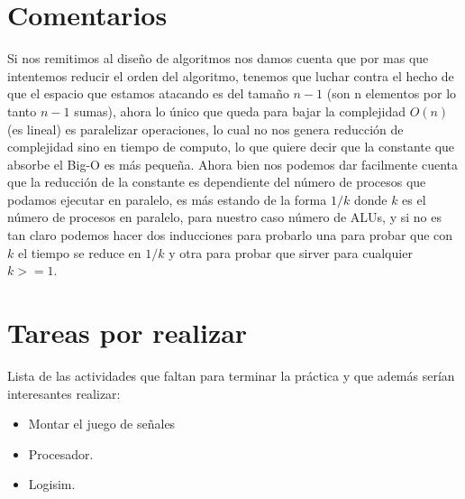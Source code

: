 \documentclass[%
		final,
		notitlepage,
		narroweqnarray,
		inline,
		twoside,
		]{ieee}
\begin{document}
	\section{Comentarios}


	

	
	Si nos remitimos al diseño de algoritmos nos damos cuenta que por mas que intentemos reducir el orden del algoritmo, tenemos que luchar contra el hecho de que el espacio que estamos atacando es del tamaño $n-1$ (son n elementos por lo tanto $n-1$ sumas), ahora lo único que queda para bajar la complejidad $O(n)$ (es lineal) es paralelizar operaciones, lo cual no nos genera reducción de complejidad sino en tiempo de computo, lo que quiere decir que la constante que absorbe el Big-O  es más pequeña. Ahora bien nos podemos dar facilmente cuenta que la reducción de la constante es dependiente del número de procesos que podamos ejecutar en paralelo, es más estando de la forma $1/k$ donde $k$ es el número de procesos en paralelo, para nuestro caso número de ALUs, y si no es tan claro podemos hacer dos inducciones para probarlo una para probar que con $k$ el tiempo se reduce en $1/k$ y otra para probar que sirver para cualquier $k>=1$.

	

	      
	      
	      
	\section{Tareas por realizar}
	Lista de las actividades que faltan para terminar la práctica y
	que además serían interesantes realizar:
	\begin{itemize}
	\item Montar el juego de señales
	\item Procesador.
	\item Logisim.
	\end{itemize}
	      \pagebreak 
	      
	      
	            \pagebreak 
		            		
	            \pagebreak 
	                                           
%	                        
%	                        
	
\end{document}
